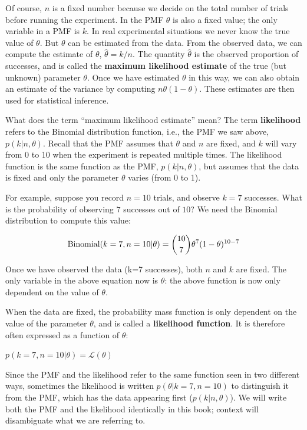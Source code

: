 \documentclass[12pt,]{krantz}
\theoremstyle{definition}
\theoremstyle{definition}
\theoremstyle{definition}
\theoremstyle{remark}
\begin{document}
Of course, \(n\) is a fixed number because we decide on the total number of trials before running the experiment. In the PMF \(\theta\) is also a fixed value; the only variable in a PMF is \(k\). In real experimental situations we never know the true value of \(\theta\). But \(\theta\) can be estimated from the data. From the observed data, we can compute the estimate of \(\theta\), \(\hat \theta=k/n\). The quantity \(\hat \theta\) is the observed proportion of successes, and is called the \textbf{maximum likelihood estimate} of the true (but unknown) parameter \(\theta\). Once we have estimated \(\theta\) in this way, we can also obtain an estimate of the variance by computing \(n\theta (1-\theta)\). These estimates are then used for statistical inference.

What does the term ``maximum likelihood estimate'' mean? The term \textbf{likelihood} refers to the Binomial distribution function, i.e., the PMF we saw above, \(p(k|n,\theta)\). Recall that the PMF assumes that \(\theta\) and \(n\) are fixed, and \(k\) will vary from 0 to 10 when the experiment is repeated multiple times. The likelihood function is the same function as the PMF, \(p(k|n,\theta)\), but assumes that the data is fixed and only the parameter \(\theta\) varies (from 0 to 1).

For example, suppose you record \(n=10\) trials, and observe \(k=7\) successes. What is the probability of observing \(7\) successes out of \(10\)? We need the Binomial distribution to compute this value:

\begin{equation}
\hbox{Binomial}(k=7,n=10|\theta) = 
\binom{10}{7} \theta^{7} (1-\theta)^{10-7}
\end{equation}

Once we have observed the data (k=7 successes), both \(n\) and \(k\) are fixed. The only variable in the above equation now is \(\theta\): the above function is now only dependent on the value of \(\theta\).

When the data are fixed, the probability mass function is only dependent on the value of the parameter \(\theta\), and is called a \textbf{likelihood function}. It is therefore often expressed as a function of \(\theta\):

\(p( k=7, n=10 | \theta) = \mathcal{L}(\theta)\)

Since the PMF and the likelihood refer to the same function seen in two different ways, sometimes the likelihood is written \(p(\theta | k=7, n=10)\) to distinguish it from the PMF, which has the data appearing first (\(p(k|n,\theta)\)). We will write both the PMF and the likelihood identically in this book; context will disambiguate what we are referring to.
\end{document}
